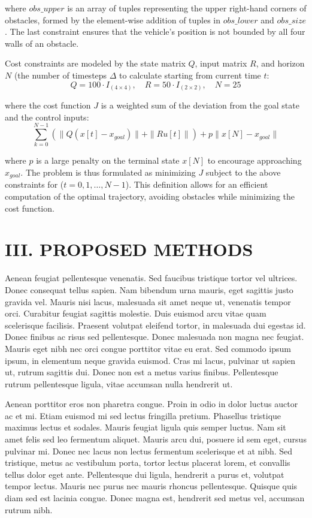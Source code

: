 \documentclass[
	letterpaper, %
	10pt, %
	unnumberedsections, %
	twoside, %
]{LTJournalArticle}
\begin{document}
\noindent where \(obs\_upper\) is an array of tuples representing the upper right-hand corners of obstacles, formed by the element-wise addition of tuples in \(obs\_lower\) and \(obs\_size\). The last constraint ensures that the vehicle's position is not bounded by all four walls of an obstacle.

Cost constraints are modeled by the state matrix \(Q\), input matrix \(R\), and horizon \(N\) (the number of timesteps \(\Delta\) to calculate starting from current time \(t\):
\[Q = 100 \cdot I_{(4\times4)}, \quad R = 50 \cdot I_{(2\times2)}, \quad N = 25\]

\noindent where the cost function \(J\) is a weighted sum of the deviation from the goal state and the control inputs:
\[\sum_{k=0}^{N-1} \left( \| Q (x[t] - x_{goal}) \| + \| R u[t] \| \right) + p \| x[N] - x_{goal} \|\]

\noindent where \(p\) is a large penalty on the terminal state \(x[N]\) to encourage approaching \(x_{goal}\).
The problem is thus formulated as minimizing \(J\) subject to the above constraints for (\(t = 0, 1, \ldots, N-1\)). This definition allows for an efficient computation of the optimal trajectory, avoiding obstacles while minimizing the cost function.

\section{III. PROPOSED METHODS}

Aenean feugiat pellentesque venenatis. Sed faucibus tristique tortor vel ultrices. Donec consequat tellus sapien. Nam bibendum urna mauris, eget sagittis justo gravida vel. Mauris nisi lacus, malesuada sit amet neque ut, venenatis tempor orci. Curabitur feugiat sagittis molestie. Duis euismod arcu vitae quam scelerisque facilisis. Praesent volutpat eleifend tortor, in malesuada dui egestas id. Donec finibus ac risus sed pellentesque. Donec malesuada non magna nec feugiat. Mauris eget nibh nec orci congue porttitor vitae eu erat. Sed commodo ipsum ipsum, in elementum neque gravida euismod. Cras mi lacus, pulvinar ut sapien ut, rutrum sagittis dui. Donec non est a metus varius finibus. Pellentesque rutrum pellentesque ligula, vitae accumsan nulla hendrerit ut.

Aenean porttitor eros non pharetra congue. Proin in odio in dolor luctus auctor ac et mi. Etiam euismod mi sed lectus fringilla pretium. Phasellus tristique maximus lectus et sodales. Mauris feugiat ligula quis semper luctus. Nam sit amet felis sed leo fermentum aliquet. Mauris arcu dui, posuere id sem eget, cursus pulvinar mi. Donec nec lacus non lectus fermentum scelerisque et at nibh. Sed tristique, metus ac vestibulum porta, tortor lectus placerat lorem, et convallis tellus dolor eget ante. Pellentesque dui ligula, hendrerit a purus et, volutpat tempor lectus. Mauris nec purus nec mauris rhoncus pellentesque. Quisque quis diam sed est lacinia congue. Donec magna est, hendrerit sed metus vel, accumsan rutrum nibh.
\end{document}
